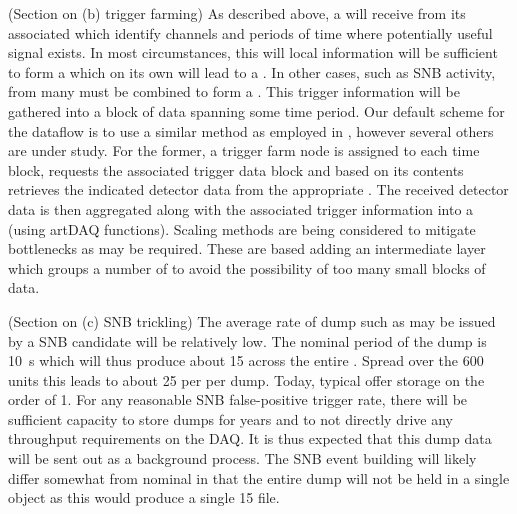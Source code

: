 (Section on (b) trigger farming) As described above, a 
will receive  from its associated 
which identify channels and periods of time where potentially useful
signal exists. 
In most circumstances, this will local information will be sufficient
to form a  which on its own will lead to a
.
In other cases, such as SNB activity,  from many
 must be combined to form a .
This trigger information will be gathered into a block of data
spanning some time period. 
Our default scheme for the dataflow is to use a similar method as
employed in , however several others are under study. 
For the former, a trigger farm node is assigned to each time block,
requests the associated trigger data block and based on its contents
retrieves the indicated detector data from the appropriate
.   
The received detector data is then aggregated along with the
associated trigger information into a  (using artDAQ
functions).
Scaling methods are being considered to mitigate bottlenecks as may be
required.  
These are based adding an intermediate layer which groups a number of
 to avoid the possibility of too many small blocks of
data.


(Section on (c) SNB trickling) The average rate of dump
 such as may be issued by a SNB candidate will be
relatively low. 
The nominal period of the dump is \SI{10}{\s} which will thus produce
about \SI{15}{\TB} across the entire  . 
Spread over the 600  units this leads to about \SI{25}{\GB}
per  per dump. 
Today, typical  offer storage on the order of \SI{1}{\TB}. 
For any reasonable SNB false-positive trigger rate, there will be
sufficient  capacity to store dumps for years and to not
directly drive any throughput requirements on the DAQ.
It is thus expected that this dump data will be sent out as a
background process. 
The SNB event building will likely differ somewhat from nominal in
that the entire dump will not be held in a single 
object as this would produce a single \SI{15}{\TB} file.

